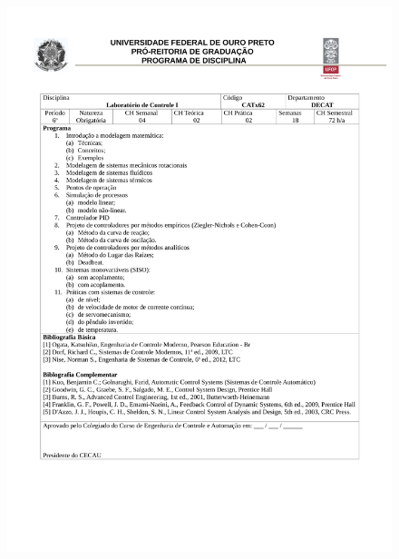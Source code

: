\begin{figure}[p]
	\centering 
	\includegraphics[scale=0.7]{capitulos/anexo1-programas-disciplina/p65.pdf}
\end{figure}

